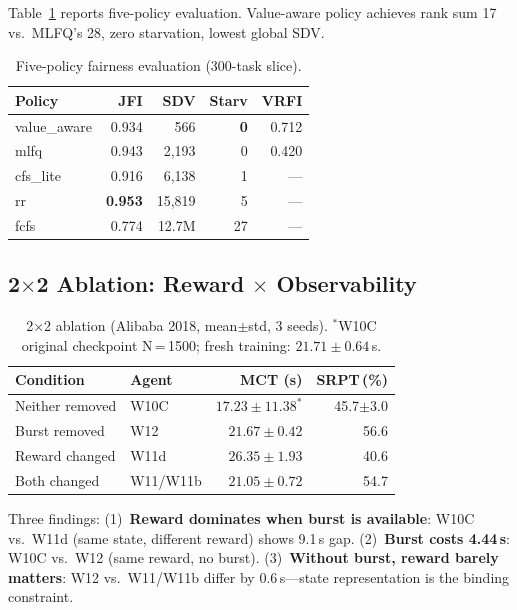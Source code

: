 \documentclass[10pt,twocolumn]{article}
\theoremstyle{remark}
\newcommand{\vrfi}{\textsc{VRFI}}
\begin{document}
Table~\ref{tab:fair} reports five-policy evaluation. Value-aware
policy achieves rank sum 17 vs.\ MLFQ's 28, zero starvation, lowest
global SDV.

\begin{table}[h]
\centering
\caption{Five-policy fairness evaluation (300-task slice).}
\label{tab:fair}
\small
\begin{tabular}{lrrrr}
\toprule
Policy & JFI & SDV & Starv & \vrfi \\
\midrule
value\_aware & 0.934 & 566 & \textbf{0} & 0.712 \\
mlfq & 0.943 & 2,193 & 0 & 0.420 \\
cfs\_lite & 0.916 & 6,138 & 1 & --- \\
rr & \textbf{0.953} & 15,819 & 5 & --- \\
fcfs & 0.774 & 12.7M & 27 & --- \\
\bottomrule
\end{tabular}
\end{table}

\subsection{2$\times$2 Ablation: Reward $\times$ Observability}
\label{sec:2x2a}
\label{sec:2x2b}

\begin{table}[h]
\centering
\caption{2$\times$2 ablation (Alibaba 2018, mean$\pm$std, 3 seeds).
$^*$W10C original checkpoint N\,=\,1500; fresh training:
$21.71\pm0.64$\,s.}
\label{tab:2x2}
\small
\begin{tabular}{llrr}
\toprule
Condition & Agent & MCT (s) & SRPT\,(\%) \\
\midrule
Neither removed & W10C & $17.23\pm11.38^*$ & 45.7$\pm$3.0 \\
Burst removed & W12 & $21.67\pm0.42$ & 56.6 \\
Reward changed & W11d & $26.35\pm1.93$ & 40.6 \\
Both changed & W11/W11b & $21.05\pm0.72$ & 54.7 \\
\bottomrule
\end{tabular}
\end{table}

Three findings: (1)~\textbf{Reward dominates when burst is available}:
W10C vs.\ W11d (same state, different reward) shows 9.1\,s gap.
(2)~\textbf{Burst costs 4.44\,s}: W10C vs.\ W12 (same reward, no
burst). (3)~\textbf{Without burst, reward barely matters}: W12
vs.\ W11/W11b differ by 0.6\,s---state representation is the
binding constraint.
\end{document}
